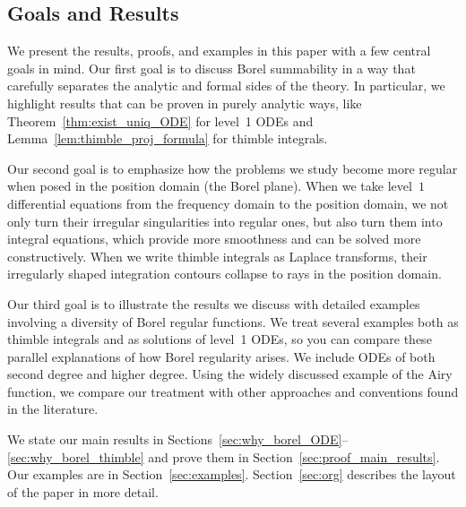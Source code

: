 \documentclass{article}
\theoremstyle{definition}
\theoremstyle{plain}
\begin{document}
\subsection{Goals and Results}
%
We present the results, proofs, and examples in this paper with a few central goals in mind. Our first goal is to discuss Borel summability in a way that carefully separates the analytic and formal sides of the theory. In particular, we highlight results that can be proven in purely analytic ways, like Theorem~\ref{thm:exist_uniq_ODE} for level~1 ODEs and Lemma~\ref{lem:thimble_proj_formula} for thimble integrals.

Our second goal is to emphasize how the problems we study become more regular when posed in the position domain (the Borel plane). When we take level~$1$ differential equations from the frequency domain to the position domain, we not only turn their irregular singularities into regular ones, but also turn them into integral equations, which provide more smoothness and can be solved more constructively. When we write thimble integrals as Laplace transforms, their irregularly shaped integration contours collapse to rays in the position domain.

Our third goal is to illustrate the results we discuss with detailed examples involving a diversity of Borel regular functions. We treat several examples both as thimble integrals and as solutions of level~1 ODEs, so you can compare these parallel explanations of how Borel regularity arises. We include ODEs of both second degree and higher degree. Using the widely discussed example of the Airy function, we compare our treatment with other approaches and conventions found in the literature.

We state our main results in Sections~\ref{sec:why_borel_ODE}--\ref{sec:why_borel_thimble} and prove them in Section~\ref{sec:proof_main_results}. Our examples are in Section~\ref{sec:examples}. Section~\ref{sec:org} describes the layout of the paper in more detail.
%
\end{document}
